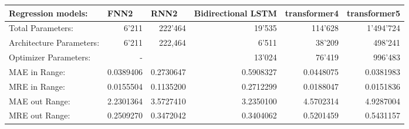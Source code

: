 \documentclass{article}
\begin{document}
\begin{table}[htbp]
\begin{tabular}{|lr|r|r|r|r|r|}
\hline
\multicolumn{2}{|l|}{Regression models:}                              & \multicolumn{1}{l|}{FNN2} & \multicolumn{1}{l|}{RNN2} & \multicolumn{1}{l|}{Bidirectional   LSTM} & \multicolumn{1}{l|}{transformer4} & \multicolumn{1}{l|}{transformer5} \\ \hline
\multicolumn{2}{|l|}{Total   Parameters:}                             & 6’211                     & 222’464                   & 19’535                                    & 114’628                           & 1’494’724                         \\
\multicolumn{2}{|l|}{Architecture   Parameters:}                      & 6’211                     & 222,464                   & 6’511                                     & 38’209                            & 498’241                           \\
\multicolumn{2}{|l|}{Optimizer   Parameters:}                         & -                         &                           & 13’024                                    & 76’419                            & 996’483                           \\
\rowcolor[HTML]{F7C7AC} 
MAE in Range:                              &                          & 0.0389406                 & 0.2730647                 & 0.5908327                                 & 0.0448075                         & 0.0381983                         \\
\rowcolor[HTML]{F7C7AC} 
MRE in Range:                              &                          & 0.0155504                 & 0.1135200                 & 0.2712299                                 & 0.0188047                         & 0.0151836                         \\
\rowcolor[HTML]{94DCF8} 
MAE out Range:                             &                          & 2.2301364                 & 3.5727410                 & 3.2350100                                 & 4.5702314                         & 4.9287004                         \\
\rowcolor[HTML]{94DCF8} 
MRE out Range:                             &                          & 0.2509270                 & 0.3472042                 & 0.3404062                                 & 0.5201459                         & 0.5431157                         \\

\end{tabular}
\end{table}
\end{document}
